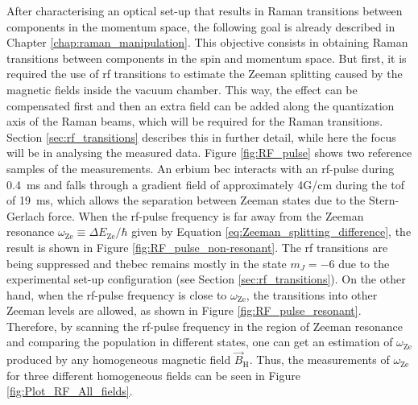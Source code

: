 After characterising an optical set-up that results in Raman transitions between components in the momentum space, the following goal is already described in Chapter \ref{chap:raman_manipulation}. This objective consists in obtaining Raman transitions between components in the spin and momentum space. But first, it is required the use of \ac{rf} transitions to estimate the Zeeman splitting caused by the magnetic fields inside the vacuum chamber. This way, the effect can be compensated first and then an extra field can be added along the quantization axis of the Raman beams, which will be required for the Raman transitions. Section \ref{sec:rf_transitions} describes this in further detail, while here the focus will be in analysing the measured data. Figure \ref{fig:RF_pulse} shows two reference samples of the measurements. An erbium \ac{bec} interacts with an \ac{rf}-pulse during \SI{0.4}{\milli\second} and falls through a gradient field of approximately 4G/cm during the \ac{tof} of \SI{19}{\milli\second}, which allows the separation between Zeeman states due to the Stern-Gerlach force. When the \ac{rf}-pulse frequency is far away from the Zeeman resonance $\omega_\text{Ze} \equiv \Delta E_{\text{Ze}}/\hbar$ given by Equation \ref{eq:Zeeman_splitting_difference}, the result is shown in Figure \ref{fig:RF_pulse_non-resonant}. The \ac{rf} transitions are being suppressed and the\ac{bec} remains mostly in the state $m_J=-6$ due to the experimental set-up configuration (see Section \ref{sec:rf_transitions}). On the other hand, when the \ac{rf}-pulse frequency is close to $\omega_\text{Ze}$, the transitions into other Zeeman levels are allowed, as shown in Figure \ref{fig:RF_pulse_resonant}. Therefore, by scanning the \ac{rf}-pulse frequency in the region of Zeeman resonance and comparing the population in different states, one can get an estimation of $\omega_\text{Ze}$ produced by any homogeneous magnetic field $\vec{B}_\text{H}$. Thus, the measurements of $\omega_\text{Ze}$ for three different homogeneous fields can be seen in Figure \ref{fig:Plot_RF_All_fields}.

